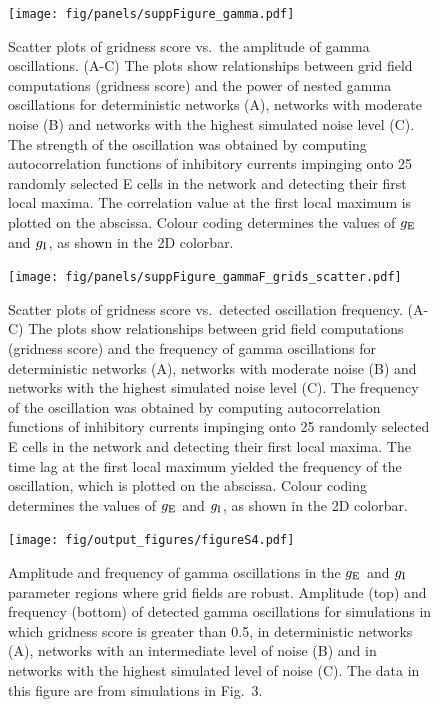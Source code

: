 \documentclass[a4paper,12pt]{article}
\newcommand{\ssc}[3]{\ensuremath{#1_{\text{#2}_{\text{#3}}}}}
\newcommand{\gE      }{\ssc{g}      {\scriptsize{E}}{}}
\newcommand{\gI      }{\ssc{g}      {\scriptsize{I}}{}}
\begin{document}
\clearpage

\setcounter{figure}{0}
\renewcommand{\figurename}{Figure 3 - figure supplement}

\begin{figure}[p]
    \internallinenumbers
    \centering
        \texttt{[image: fig/panels/suppFigure\_gamma.pdf]}
    \caption{Scatter plots of gridness score vs.\ the amplitude of gamma
    oscillations. (A-C) The plots show relationships between grid field
    computations (gridness score) and the power of nested gamma oscillations
    for deterministic networks (A), networks with moderate noise (B) and
    networks with the highest simulated noise level (C).
    The strength of the oscillation was obtained
    by computing autocorrelation functions of inhibitory currents impinging
    onto 25 randomly selected E cells in the network and detecting their first
    local maxima. The correlation value at the first local maximum is plotted
    on the abscissa. Colour coding determines the values of $\gE$ and $\gI$, as
    shown in the 2D colorbar.}
\end{figure}

\clearpage

\begin{figure}[ht!]
    \internallinenumbers
    \centering
        \texttt{[image: fig/panels/suppFigure\_gammaF\_grids\_scatter.pdf]}
    \caption{Scatter plots of gridness score vs.\ detected oscillation
    frequency.  (A-C) The plots show relationships between grid field
    computations (gridness score) and the frequency of gamma oscillations for
    deterministic networks (A), networks with moderate noise (B) and networks
    with the highest simulated noise level (C).  The frequency of the
    oscillation was obtained by computing autocorrelation functions of
    inhibitory currents impinging onto 25 randomly selected E cells in the
    network and detecting their first local maxima.  The time lag at the first
    local maximum yielded the frequency of the oscillation, which is plotted on
    the abscissa. Colour coding determines the values of $\gE$ and $\gI$, as
    shown in the 2D colorbar.}
\end{figure}

\clearpage

\begin{figure}[p]
    \internallinenumbers
    \centering
        \texttt{[image: fig/output\_figures/figureS4.pdf]}
    \caption{Amplitude and frequency of gamma oscillations in the $\gE$ and
    $\gI$ parameter regions where grid fields are robust. Amplitude (top) and
    frequency (bottom) of detected gamma oscillations for simulations in which
    gridness score is greater than 0.5, in deterministic networks (A), networks
    with an intermediate level of noise (B) and in networks with the highest
    simulated level of noise (C). The data in this figure are from simulations
    in Fig.~3.}
\end{figure}
\end{document}
